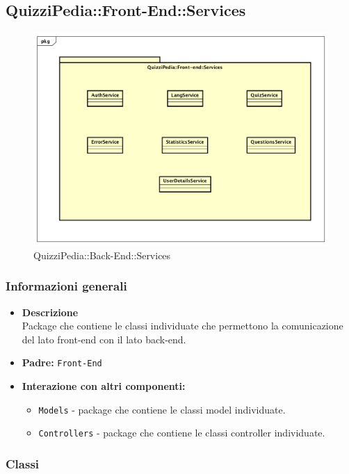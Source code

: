 \newpage
\subsection{QuizziPedia::Front-End::Services}
\begin{figure}
	\centering
	\includegraphics[scale=0.45]{UML/Package/QuizziPedia_Front-End_Services.png}
	\caption{QuizziPedia::Back-End::Services}
\end{figure}
\subsubsection{Informazioni generali}
\begin{itemize}
	\item \textbf{Descrizione} \\ Package che contiene le classi individuate che permettono la comunicazione del lato front-end con il lato back-end. 
	\item \textbf{Padre:} \texttt{Front-End}
	\item \textbf{Interazione con altri componenti:}
	\begin{itemize}
		\item \texttt{Models} - package che contiene le classi model individuate.
		\item \texttt{Controllers} - package che contiene le classi controller individuate.
	\end{itemize} 
\end{itemize}
\subsubsection{Classi}

